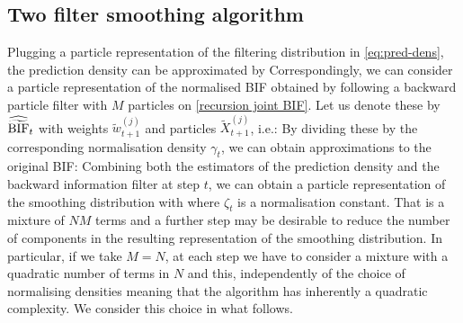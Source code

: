 \subsection{\label{introTFS}Two filter smoothing algorithm}
Plugging a particle representation of the filtering distribution in \eqref{eq:pred-dens}, the prediction density can be approximated by
%
%
Correspondingly, we can consider a particle representation of the normalised BIF obtained by following a backward particle filter with $M$ particles on \eqref{recursion joint BIF}. 
Let us denote these by $\widehat{\widetilde{\text{BIF}}}_{t}$ with weights $\tilde w_{t+1}^{(j)}$ and particles $\tilde X^{(j)}_{t+1}$, i.e.:
%
%
By dividing these by the corresponding normalisation density $\gamma_{t}$, we can obtain approximations to the original BIF:
%
%
Combining both the estimators of the prediction density and the backward information filter at step $t$, we can obtain a particle representation of the smoothing distribution with
%
%
where $\zeta_{t}$ is a normalisation constant.
That is a mixture of $NM$ terms and a further step may be desirable to reduce the number of components in the resulting representation of the smoothing distribution.
In particular, if we take $M=N$, at each step we have to consider a mixture with a quadratic number of terms in $N$ and this, independently of the choice of normalising densities meaning that the algorithm has inherently a quadratic complexity. We consider this choice in what follows.

